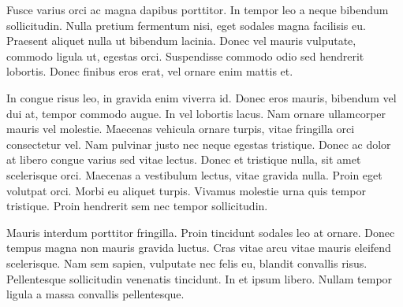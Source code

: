 \documentclass{article}
\begin{document}
Fusce varius orci ac magna dapibus porttitor. In tempor leo a neque bibendum sollicitudin. Nulla pretium fermentum nisi, eget sodales magna facilisis eu. Praesent aliquet nulla ut bibendum lacinia. Donec vel mauris vulputate, commodo ligula ut, egestas orci. Suspendisse commodo odio sed hendrerit lobortis. Donec finibus eros erat, vel ornare enim mattis et.

\begin{question}
	In congue risus leo, in gravida enim viverra id. Donec eros mauris, bibendum vel dui at, tempor commodo augue. In vel lobortis lacus. Nam ornare ullamcorper mauris vel molestie. Maecenas vehicula ornare turpis, vitae fringilla orci consectetur vel. Nam pulvinar justo nec neque egestas tristique. Donec ac dolor at libero congue varius sed vitae lectus. Donec et tristique nulla, sit amet scelerisque orci. Maecenas a vestibulum lectus, vitae gravida nulla. Proin eget volutpat orci. Morbi eu aliquet turpis. Vivamus molestie urna quis tempor tristique. Proin hendrerit sem nec tempor sollicitudin.
\end{question}

Mauris interdum porttitor fringilla. Proin tincidunt sodales leo at ornare. Donec tempus magna non mauris gravida luctus. Cras vitae arcu vitae mauris eleifend scelerisque. Nam sem sapien, vulputate nec felis eu, blandit convallis risus. Pellentesque sollicitudin venenatis tincidunt. In et ipsum libero. Nullam tempor ligula a massa convallis pellentesque.

\end{document}
